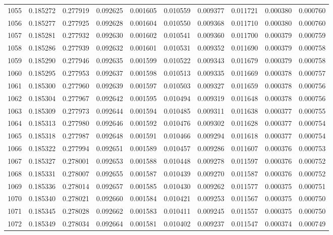 \begin{tabular}{lrrrrrrrrr}
1055 & 0.185272 & 0.277919 & 0.092625 & 0.001605 & 0.010559 & 0.009377 & 0.011721 & 0.000380 & 0.000760 \\
1056 & 0.185277 & 0.277925 & 0.092628 & 0.001604 & 0.010550 & 0.009368 & 0.011710 & 0.000380 & 0.000760 \\
1057 & 0.185281 & 0.277932 & 0.092630 & 0.001602 & 0.010541 & 0.009360 & 0.011700 & 0.000379 & 0.000759 \\
1058 & 0.185286 & 0.277939 & 0.092632 & 0.001601 & 0.010531 & 0.009352 & 0.011690 & 0.000379 & 0.000758 \\
1059 & 0.185290 & 0.277946 & 0.092635 & 0.001599 & 0.010522 & 0.009343 & 0.011679 & 0.000379 & 0.000758 \\
1060 & 0.185295 & 0.277953 & 0.092637 & 0.001598 & 0.010513 & 0.009335 & 0.011669 & 0.000378 & 0.000757 \\
1061 & 0.185300 & 0.277960 & 0.092639 & 0.001597 & 0.010503 & 0.009327 & 0.011659 & 0.000378 & 0.000756 \\
1062 & 0.185304 & 0.277967 & 0.092642 & 0.001595 & 0.010494 & 0.009319 & 0.011648 & 0.000378 & 0.000756 \\
1063 & 0.185309 & 0.277973 & 0.092644 & 0.001594 & 0.010485 & 0.009311 & 0.011638 & 0.000377 & 0.000755 \\
1064 & 0.185313 & 0.277980 & 0.092646 & 0.001592 & 0.010476 & 0.009302 & 0.011628 & 0.000377 & 0.000754 \\
1065 & 0.185318 & 0.277987 & 0.092648 & 0.001591 & 0.010466 & 0.009294 & 0.011618 & 0.000377 & 0.000754 \\
1066 & 0.185322 & 0.277994 & 0.092651 & 0.001589 & 0.010457 & 0.009286 & 0.011607 & 0.000376 & 0.000753 \\
1067 & 0.185327 & 0.278001 & 0.092653 & 0.001588 & 0.010448 & 0.009278 & 0.011597 & 0.000376 & 0.000752 \\
1068 & 0.185331 & 0.278007 & 0.092655 & 0.001587 & 0.010439 & 0.009270 & 0.011587 & 0.000376 & 0.000752 \\
1069 & 0.185336 & 0.278014 & 0.092657 & 0.001585 & 0.010430 & 0.009262 & 0.011577 & 0.000375 & 0.000751 \\
1070 & 0.185340 & 0.278021 & 0.092660 & 0.001584 & 0.010421 & 0.009253 & 0.011567 & 0.000375 & 0.000750 \\
1071 & 0.185345 & 0.278028 & 0.092662 & 0.001583 & 0.010411 & 0.009245 & 0.011557 & 0.000375 & 0.000750 \\
1072 & 0.185349 & 0.278034 & 0.092664 & 0.001581 & 0.010402 & 0.009237 & 0.011547 & 0.000374 & 0.000749 \\

\end{tabular}

